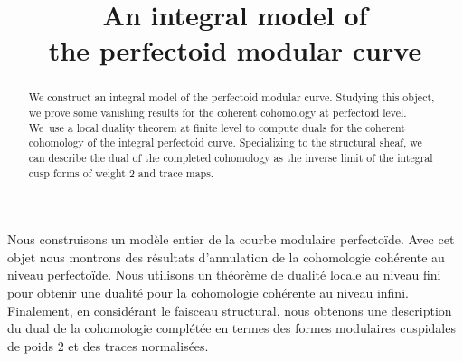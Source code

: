 \documentclass[JEP,XML,SOM,Unicode,published]{cedram}
\numberwithin{equation}{section}
\theoremstyle{definition}
\begin{document}
\frontmatter

\title[An integral model of the perfectoid modular curve]{An integral model of\\ the perfectoid modular curve}

\author[\initial{J. E.} \lastname{Rodríguez Camargo}]{ }
\address{UMPA UMR 5669 CNRS, ENS de Lyon\\
46 allée d’Italie, 69364 Lyon Cedex 07, France}

\begin{abstract}
We construct an integral model of the perfectoid modular curve. Studying this object, we prove some vanishing results for the coherent cohomology at perfectoid level. We~use a local duality theorem at finite level to compute duals for the coherent cohomology of the integral perfectoid curve. Specializing to the structural sheaf, we can describe the dual of the completed cohomology as the inverse limit of the integral cusp forms of weight $2$ and trace maps.
\end{abstract}





\begin{altabstract}
Nous construisons un modèle entier de la courbe modulaire perfectoïde. Avec cet objet nous montrons des résultats d’annulation de la cohomologie cohérente au niveau perfectoïde. Nous utilisons un théorème de dualité locale au niveau fini pour obtenir une dualité pour la cohomologie cohérente au niveau infini. Finalement, en considérant le faisceau structural, nous obtenons une description du dual de la cohomologie complétée en termes des formes modulaires cuspidales de poids $2$ et des traces normalisées.
\end{altabstract}

\maketitle
\vspace*{-\baselineskip}
\tableofcontents
\mainmatter
\end{document}
